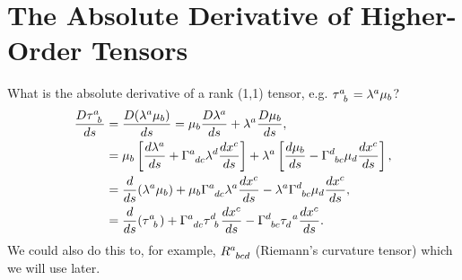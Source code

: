 \documentclass[a4paper, 11pt, normalem]{report}
\begin{document}
\section{The Absolute Derivative of Higher-Order Tensors}
What is the absolute derivative of a rank (1,1) tensor, e.g. $\tensor{\tau}{^a_b}=\lambda^a\mu_b$?
\begin{align}
    \begin{split}
        \frac{D\tensor{\tau}{^a_b}}{ds} &= \frac{D(\lambda^a\mu_b)}{ds} = \mu_b\frac{D\lambda^a}{ds} + \lambda^a\frac{D\mu_b}{ds}, \\
                                        &= \mu_b\left[\frac{d\lambda^a}{ds}+\tensor{\Gamma}{^a_{dc}}\lambda^d\frac{dx^c}{ds}\right] + \lambda^a\left[\frac{d\mu_b}{ds}-\tensor{\Gamma}{^d_{bc}}\mu_d\frac{dx^c}{ds}\right],\\
                                        &= \frac{d}{ds}(\lambda^a\mu_b) + \mu_b\tensor{\Gamma}{^a_{dc}}\lambda^a\frac{dx^c}{ds} - \lambda^a\tensor{\Gamma}{^d_{bc}}\mu_d\frac{dx^c}{ds},\\
                                        &= \frac{d}{ds}(\tensor{\tau}{^a_b}) + \tensor{\Gamma}{^a_{dc}}\tensor{\tau}{^d_b}\frac{dx^c}{ds} - \tensor{\Gamma}{^d_{bc}}\tensor{\tau}{_d^a}\frac{dx^c}{ds}.
    \end{split}
\end{align}
We could also do this to, for example, $\tensor{R}{^a_{bcd}}$ (Riemann's curvature tensor) which we will use later.
\end{document}
